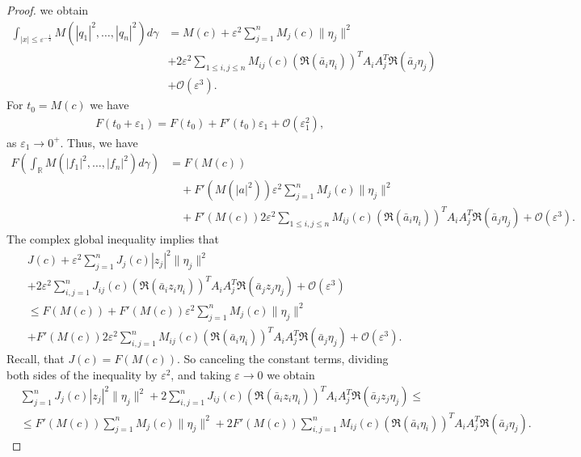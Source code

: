 \documentclass[9pt, a4paper]{amsart}
\newcommand{\1}{{\chi_{}}}%
\numberwithin{equation}{section}
\begin{document}
\begin{proof}
		we obtain
		\begin{align*}
			\int_{| x|\leq \varepsilon^{-\frac{1}{2}}}M(|q_1|^2,\ldots,|q_n|^2)d\gamma &= M(c)  +\varepsilon^2\sum_{j=1}^n M_j(c) \|\eta_j\|^2\\
			&+ 2\varepsilon^2\sum_{1\leq i,j\leq n} M_{ij}(c)(\Re(\bar{a}_{i}\eta_{i}))^{T} A_iA_j^T\Re(\bar{a}_{j}\eta_{j})\\
   &+ \mathcal{O}(\varepsilon^3).
		\end{align*}
		For $t_{0}=M(c)$ we have 
		\begin{align*}
			F(t_{0}+\varepsilon_{1}) = F(t_{0}) +F'(t_{0})\varepsilon_{1}+\mathcal{O}(\varepsilon_{1}^{2}),
		\end{align*}
		as $\varepsilon_{1} \to 0^{+}$. Thus, we have
		\begin{align*}
			F\left( \int_{\mathbb{R}} M(|f_1|^2,\ldots,|f_n|^2) d\gamma\right) &  = F(M(c))\\
			&\quad+F'(M(|a|^2))\varepsilon^2\sum_{j=1}^n M_j(c) \|\eta_j\|^2\\
			&\quad +F'(M(c)) 2\varepsilon^2\sum_{1\leq i,j\leq n} M_{ij}(c)(\Re(\bar{a}_{i}\eta_{i}))^{T} A_iA_j^T \Re(\bar{a}_{j}\eta_{j})  + \mathcal{O}(\varepsilon^3).
		\end{align*}
		The complex global inequality implies that
		\begin{align*}
			& J(c)  +\varepsilon^2\sum_{j=1}^n J_j(c) |z_j|^2\|\eta_j\|^2\\
			&+ 2\varepsilon^2\sum_{ i,j=1}^{n} J_{ij}(c)(\Re(\bar{a}_{i}z_{i}\eta_{i}))^{T} A_{i}A_{j}^{T} \Re(\bar{a}_{j}z_{j}\eta_{j}) + \mathcal{O}(\varepsilon^3)\\
			&\leq F(M(c))+F'(M(c))\varepsilon^2\sum_{j=1}^n M_j(c) \|\eta_j\|^2\\
			& +F'(M(c)) 2\varepsilon^2 \sum_{ i,j=1}^{n} M_{ij}(c)(\Re(\bar{a}_{i}\eta_{i}))^{T} A_iA_j^T\Re(\bar{a}_{j}\eta_{j})  + \mathcal{O}(\varepsilon^3).
		\end{align*}
		Recall, that $J(c)=F(M(c))$. So canceling the constant terms,  dividing both sides of the inequality by $\varepsilon^{2}$,  and taking $\varepsilon \to 0$ we obtain 
		\begin{align*}
			& \sum_{j=1}^n J_j(c) |z_j|^2\|\eta_j\|^2+ 2 \sum_{ i,j=1}^{n} J_{ij}(c)(\Re(\bar{a}_{i}z_{i}\eta_{i}))^{T} A_{i}A_{j}^{T} \Re(\bar{a}_{j}z_{j}\eta_{j})\leq\\
			&\leq F'(M(c))\sum_{j=1}^n M_j(c) \|\eta_j\|^2+ 2F'(M(c)) \sum_{ i,j=1}^{n} M_{ij}(c)(\Re(\bar{a}_{i}\eta_{i}))^{T} A_iA_j^T \Re(\bar{a}_{j}\eta_{j}).
		\end{align*}

\end{proof}
\end{document}

